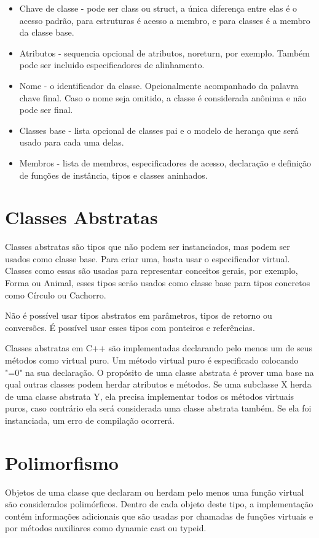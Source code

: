 \documentclass[rel_mlp]{iiufrgs}
\begin{document}
\begin{itemize}
	\item Chave de classe - pode ser class ou struct, a única diferença entre elas é o acesso padrão, para estruturas é acesso a membro, e para classes é a membro da classe base.
	\item Atributos - sequencia opcional de atributos, noreturn, por exemplo. Também pode ser incluido especificadores de alinhamento.
	\item Nome - o identificador da classe. Opcionalmente acompanhado da palavra chave final. Caso o nome seja omitido, a classe é considerada anônima e não pode ser final.
	\item Classes base -  lista opcional de classes pai e o modelo de herança que será usado para cada uma delas.
	\item Membros - lista de membros, especificadores de acesso, declaração e definição de funções de instância, tipos e classes aninhados.
\end{itemize}

\section{Classes Abstratas}
Classes abstratas são tipos que não podem ser instanciados, mas podem ser usados como classe base. Para criar uma, basta usar o especificador virtual. Classes como essas são usadas para representar conceitos gerais, por exemplo, Forma ou Animal, esses tipos serão usados como classe base para tipos concretos como Círculo ou Cachorro. 

Não é possível usar tipos abstratos em parâmetros, tipos de retorno ou conversões. É possível usar esses tipos com ponteiros e referências.

Classes abstratas em C++ são implementadas declarando pelo menos um de seus métodos como virtual puro. Um método virtual puro é especificado colocando "=0" na sua declaração. O propósito de uma classe abstrata é prover uma base na qual outras classes podem herdar atributos e métodos. Se uma subclasse X herda de uma classe abstrata Y, ela precisa implementar todos os métodos virtuais puros, caso contrário ela será considerada uma classe abstrata também. Se ela foi instanciada, um erro de compilação ocorrerá.

\section{Polimorfismo}
Objetos de uma classe que declaram ou herdam pelo menos uma função virtual são considerados polimórficos. Dentro de cada objeto deste tipo, a implementação contém informações adicionais que são usadas por chamadas de funções virtuais e por métodos auxiliares como dynamic cast ou typeid.
\end{document}

